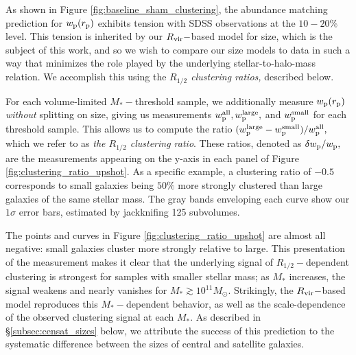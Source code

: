 \documentclass[usenatbib,usegraphicx,letterpaper]{mn2e}
\newcommand{\rhalf}{R_{1/2}}
\newcommand{\mstar}{M_{\ast}}
\newcommand{\rvir}{R_{\rm vir}}
\newcommand{\rproj}{r_{\rm p}}
\newcommand{\wproj}{w_{\rm p}}
\newcommand{\wplarge}{w_{\rm p}^{\rm large}}
\newcommand{\wpsmall}{w_{\rm p}^{\rm small}}
\newcommand{\wpall}{w_{\rm p}^{\rm all}}
\newcommand{\msun}{M_\odot}
\begin{document}
As shown in Figure \ref{fig:baseline_sham_clustering}, the abundance matching prediction for $\wproj(\rproj)$ exhibits tension with SDSS observations at the $10-20\%$ level. This tension is inherited by our $\rvir-$based model for size, which is the subject of this work, and so we wish to compare our size models to data in such a way that minimizes the role played by the underlying stellar-to-halo-mass relation. We accomplish this using the {\em $\rhalf$ clustering ratios,} described below.

For each volume-limited $\mstar-$threshold sample, we additionally measure $\wproj(\rproj)$ {\em without} splitting on size, giving us measurements $\wpall, \wplarge,$ and $\wpsmall$ for each threshold sample. This allows us to compute the ratio $(\wplarge-\wpsmall)/\wpall,$ which we refer to as {\em the $\rhalf$ clustering ratio}. These ratios, denoted as $\delta\wproj/\wproj,$ are the measurements appearing on the y-axis in each panel of Figure \ref{fig:clustering_ratio_upshot}. As a specific example, a clustering ratio of $-0.5$ corresponds to small galaxies being $50\%$ more strongly clustered than large galaxies of the same stellar mass. The gray bands enveloping each curve show our $1\sigma$ error bars, estimated by jackknifing 125 subvolumes. 

The points and curves in Figure \ref{fig:clustering_ratio_upshot} are almost all negative: small galaxies cluster more strongly relative to large. This presentation of the measurement makes it clear that the underlying signal of $\rhalf-$dependent clustering is strongest for samples with smaller stellar mass; as $\mstar$ increases, the signal weakens and nearly vanishes for $\mstar\gtrsim10^{11}\msun.$ Strikingly, the $\rvir-$based model reproduces this $\mstar-$dependent behavior, as well as the scale-dependence of the observed clustering signal at each $\mstar.$ As described in \S\ref{subsec:censat_sizes} below, we attribute the success of this prediction to the systematic difference between the sizes of central and satellite galaxies.

\end{document}
